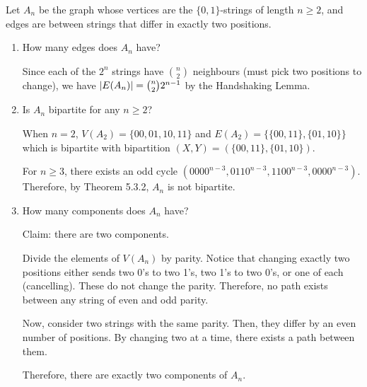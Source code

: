 \documentclass[class=math239,notes,tikz]{agony}
\begin{document}
\begin{xca}\label{xca:4107}
  Let $A_n$ be the graph whose vertices are the $\{0,1\}$-strings of length $n \geq 2$,
  and edges are between strings that differ in exactly two positions.
\end{xca}
\begin{enumerate}
  \item How many edges does $A_n$ have?
        \begin{sol}
          Since each of the $2^n$ strings have $\binom{n}{2}$ neighbours
          (must pick two positions to change),
          we have $\abs{E(A_n)} = \binom{n}{2}2^{n-1}$ by the Handshaking Lemma.
        \end{sol}
  \item Is $A_n$ bipartite for any $n \geq 2$?
        \begin{sol}
          When $n = 2$, $V(A_2) = \{00,01,10,11\}$
          and $E(A_2) = \{\{00,11\},\{01,10\}\}$
          which is bipartite with bipartition $(X,Y) = (\{00,11\},\{01,10\})$.

          For $n \geq 3$, there exists an odd cycle
          $(0000^{n-3}, 0110^{n-3}, 1100^{n-3}, 0000^{n-3})$.
          Therefore, by Theorem 5.3.2, $A_n$ is not bipartite.
        \end{sol}
  \item How many components does $A_n$ have?
        \begin{sol}
          Claim: there are two components.

          Divide the elements of $V(A_n)$ by parity.
          Notice that changing exactly two positions either sends
          two 0's to two 1's, two 1's to two 0's, or one of each (cancelling).
          These do not change the parity.
          Therefore, no path exists between any string of even and odd parity.

          Now, consider two strings with the same parity.
          Then, they differ by an even number of positions.
          By changing two at a time, there exists a path between them.

          Therefore, there are exactly two components of $A_n$.
        \end{sol}
\end{enumerate}
\end{document}

